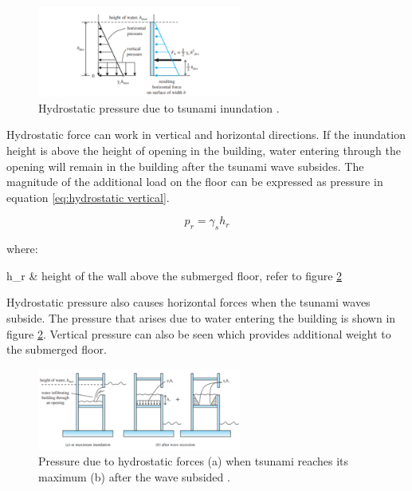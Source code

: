 \documentclass{cup-pan}
\makeatletter
\newenvironment{conditions*}
  {\par\vspace{\abovedisplayskip}\noindent
   \tabularx{\columnwidth}{>{$}l<{$} @{${}={}$} >{\raggedright\arraybackslash}X}}
  {\endtabularx\par\vspace{\belowdisplayskip}}
\makeatother
\begin{document}
\begin{figure}[H]
\centering
\includegraphics[width=0.6\textwidth]{Picture1.png}
\caption{Hydrostatic pressure due to tsunami inundation \citep{leet}.}
\label{fig:hydrostatic}
\end{figure}

Hydrostatic force can work in vertical and horizontal directions. If the inundation height is above the height of opening in the building, water entering through the opening will remain in the building after the tsunami wave subsides. The magnitude of the additional load on the floor can be expressed as pressure in equation \ref{eq:hydrostatic vertical}.

\begin{equation}
p_r= \gamma_s h_{r}
\label{eq:hydrostatic vertical}
\end{equation}

\noindent where:

\begin{conditions*}
h_r    &  height of the wall above the submerged floor, refer to figure \ref{fig: vertical hydrostatic}\\
\end{conditions*}

Hydrostatic pressure also causes horizontal forces when the tsunami waves subside. The pressure that arises due to water entering the building is shown in figure \ref{fig: vertical hydrostatic}. Vertical pressure can also be seen which provides additional weight to the submerged floor.


\begin{figure}[H]
\centering
\includegraphics[width=0.6\textwidth]{Picture2.png}
\caption{Pressure due to hydrostatic forces (a) when tsunami reaches its maximum (b) after the wave subsided \citep{leet}.}
\label{fig: vertical hydrostatic}
\end{figure}
\end{document}
